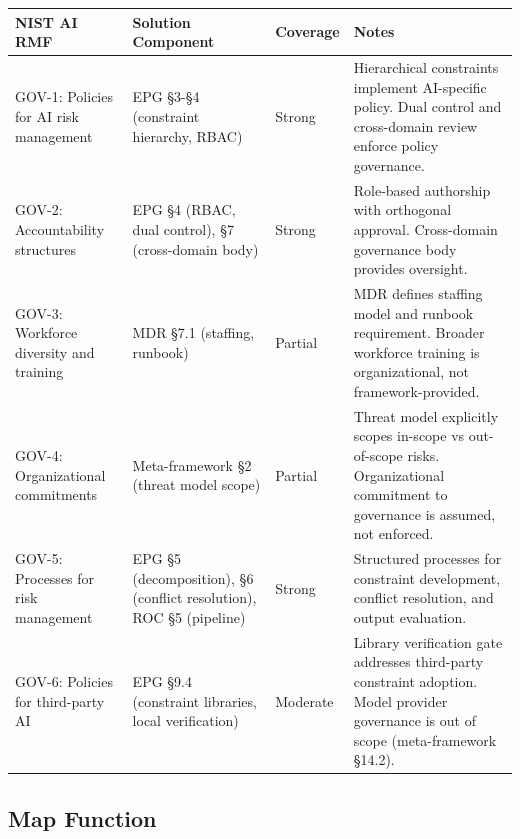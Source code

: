 \begin{table}[ht]
  \centering\small
  \begin{tabular}{@{}>{\raggedright\arraybackslash}p{2.10cm}>{\raggedright\arraybackslash}p{3.60cm}>{\raggedright\arraybackslash}p{1.10cm}>{\raggedright\arraybackslash}p{7.21cm}@{}}
  \toprule
  NIST AI RMF & Solution Component & Coverage & Notes \\
  \midrule
  GOV-1: Policies for AI risk management & EPG \S{}3-\S{}4 (constraint hierarchy, RBAC) & Strong & Hierarchical constraints implement AI-specific policy. Dual control and cross-domain review enforce policy governance. \\
  GOV-2: Accountability structures & EPG \S{}4 (RBAC, dual control), \S{}7 (cross-domain body) & Strong & Role-based authorship with orthogonal approval. Cross-domain governance body provides oversight. \\
  GOV-3: Workforce diversity and training & MDR \S{}7.1 (staffing, runbook) & Partial & MDR defines staffing model and runbook requirement. Broader workforce training is organizational, not framework-provided. \\
  GOV-4: Organizational commitments & Meta-framework \S{}2 (threat model scope) & Partial & Threat model explicitly scopes in-scope vs out-of-scope risks. Organizational commitment to governance is assumed, not enforced. \\
  GOV-5: Processes for risk management & EPG \S{}5 (decomposition), \S{}6 (conflict resolution), ROC \S{}5 (pipeline) & Strong & Structured processes for constraint development, conflict resolution, and output evaluation. \\
  GOV-6: Policies for third-party AI & EPG \S{}9.4 (constraint libraries, local verification) & Moderate & Library verification gate addresses third-party constraint adoption. Model provider governance is out of scope (meta-framework \S{}14.2). \\
  \bottomrule
  \end{tabular}
\end{table}


\subsection{Map Function}


